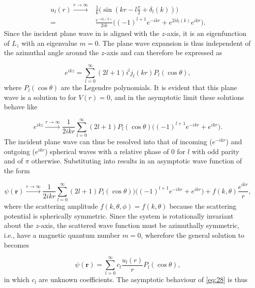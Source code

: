 \begin{equation}\label{eq:assympt}
\begin{split}
u_l(r) \xrightarrow{r \to \infty} &\frac{1}{k}\big(\sin(kr - l\frac{\pi}{2} + \delta_l(k))\big)\\
=&\frac{e^{-i\delta_l(k)}}{2ik}\big((-1)^{l+1}e^{-ikr} + e^{2i\delta_l(k)}e^{ikr}\big).
\end{split}
\end{equation}
Since the incident plane wave in  is aligned with the $z$-axis, it is an eigenfunction of $L_z$ with an eigenvalue $m=0$. The plane wave expansion is thus independent of the azimuthal angle around the $z$-axis and can therefore be expressed as

\begin{equation}\label{eq:27}
e^{ikz} = \sum_{l=0}^{\infty} (2l+1)i^l j_l(kr)P_l(\cos\theta),
\end{equation}
where $P_l(\cos\theta)$ are the Legendre polynomials. It is evident that this plane wave is a solution to  for $V(r) = 0$, and in the asymptotic limit these solutions behave like

\begin{equation}\label{eq:29}
e^{ikz} \xrightarrow{r \to \infty} \frac{1}{2ikr} \sum_{l=0}^{\infty} (2l+1)P_l(\cos\theta)\big((-1)^{l+1}e^{-ikr} + e^{ikr}\big).
\end{equation}
The incident plane wave can thus be resolved into that of incoming ($e^{-ikr}$) and outgoing ($e^{ikr}$) spherical waves with a relative phase of $0$ for $l$ with odd parity and of $\pi$ otherwise. Substituting  into  results in an asymptotic wave function of the form

\begin{equation}\label{eq:30}
\psi(\mathbf{r}) \xrightarrow{r \to \infty} \frac{1}{2ikr}\sum_{l=0}^{\infty} (2l+1)P_l(\cos\theta))\big((-1)^{l+1}e^{-ikr} + e^{ikr}\big) + f(k, \theta) \frac{e^{ikr}}{r},
\end{equation} 
where the scattering amplitude $f(k,\theta,\phi)=f(k,\theta)$ because the scattering potential is spherically symmetric. Since the system is rotationally invariant about the $z$-axis, the scattered wave function must be azimuthally symmetric, i.e., have a magnetic quantum number $m=0$, wherefore the general solution to  becomes

\begin{equation}\label{eq:28}
\psi(\mathbf{r}) = \sum_{l=0}^{\infty} c_l \frac{u_l(r)}{r} P_l(\cos\theta),
\end{equation} 
in which $c_l$ are unknown coefficients. The asymptotic behaviour of \eqref{eq:28} is thus

